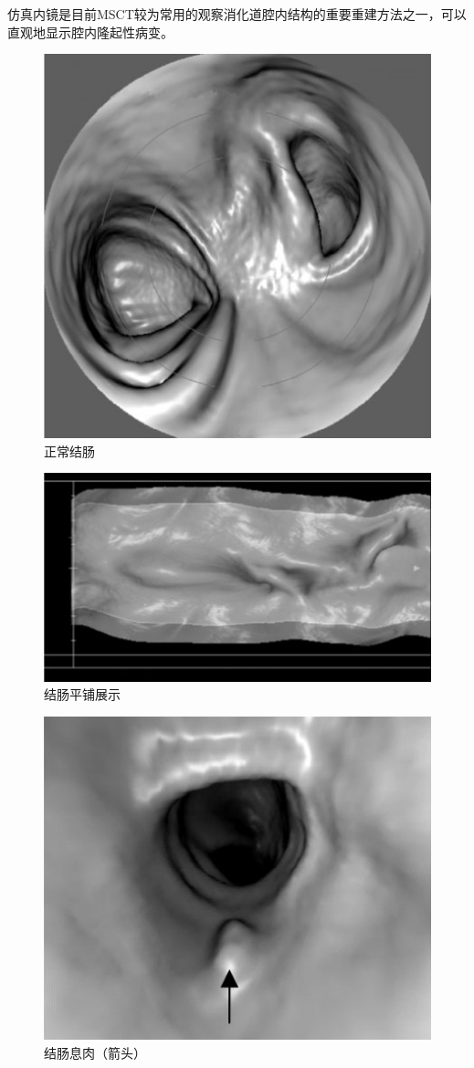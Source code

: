 仿真内镜是目前MSCT较为常用的观察消化道腔内结构的重要重建方法之一，可以直观地显示腔内隆起性病变。

\begin{figure}[!htbp]
 \centering
 \includegraphics{./images/Image00184.jpg}
 \captionsetup{justification=centering}
 \caption{正常结肠}
  \end{figure} 
 \FloatBarrier

\begin{figure}[!htbp]
 \centering
 \includegraphics{./images/Image00185.jpg}
 \captionsetup{justification=centering}
 \caption{结肠平铺展示}
  \end{figure} 
 \FloatBarrier

\begin{figure}[!htbp]
 \centering
 \includegraphics{./images/Image00186.jpg}
 \captionsetup{justification=centering}
 \caption{结肠息肉（箭头）}
  \end{figure} 
 \FloatBarrier